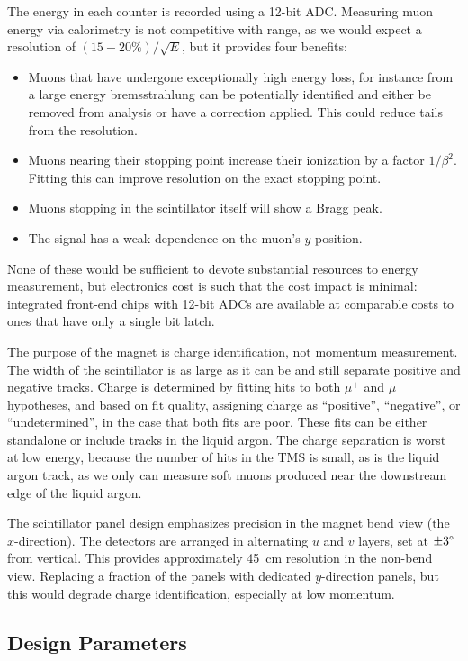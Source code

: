 The energy in each counter is recorded using a 12-bit ADC. Measuring muon energy via calorimetry is not competitive with range, as we would expect a resolution of $(15-20\%)/\sqrt{E}$, but it provides four benefits:
\begin{itemize}
\item{Muons that have undergone exceptionally high energy loss, for instance from a large energy bremsstrahlung can be potentially identified and either be removed from analysis or have a correction applied. This could reduce tails from the resolution.}
\item{Muons nearing their stopping point increase their ionization by a factor $1/\beta^2$. Fitting this can improve resolution on the exact stopping point. } 
\item{Muons stopping in the scintillator itself will show a Bragg peak. } 
\item{The signal has a weak dependence on the muon's $y$-position. } 
\end{itemize}

None of these would be sufficient to devote substantial resources to energy measurement, but electronics cost is such that the cost impact is minimal: integrated front-end chips with 12-bit ADCs are available at comparable costs to ones that have only a single bit latch.

The purpose of the magnet is charge identification, not momentum measurement. The width of the scintillator is as large as it can be and still separate positive and negative tracks. Charge is determined by fitting hits to both $\mu^+$ and $\mu^-$ hypotheses, and based on fit quality, assigning charge as ``positive'', ``negative'', or ``undetermined'', in the case that both fits are poor. These fits can be either standalone or include tracks in the liquid argon. The charge separation is worst at low energy, because the number of hits in the TMS is small, as is the liquid argon track, as we only can measure soft muons produced near the downstream edge of the liquid argon. 

The scintillator panel design emphasizes precision in the magnet bend view (the $x$-direction). The detectors are arranged in alternating $u$ and $v$ layers, set at $\pm 3 \degree$ from vertical. This provides approximately 45~cm resolution in the non-bend view. Replacing a fraction of the panels with dedicated $y$-direction panels, but this would degrade charge identification, especially at low momentum.

\subsection{Design Parameters}
\label{sec:tms-ovvw-param}

